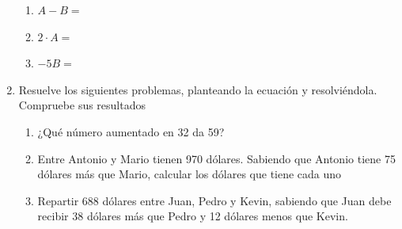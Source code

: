 \documentclass[fleqn]{article}
\begin{document}
\begin{enumerate}
\begin{enumerate}
   \item $A-B=$\noanswer[25pt]
   \item $2\cdot A=$\noanswer[25pt]
   \item $-5B=$\noanswer[25pt]
  \end{enumerate}
  \item Resuelve los siguientes problemas, planteando la ecuación y resolviéndola. Compruebe sus resultados
  \begin{enumerate}
   \item ¿Qué número aumentado en 32 da 59?\noanswer
   \item Entre Antonio y Mario tienen 970 dólares. Sabiendo que Antonio tiene 75 dólares más que Mario, calcular los dólares que tiene cada uno\noanswer
   \item Repartir 688 dólares entre Juan, Pedro y Kevin, sabiendo que Juan debe recibir 38 dólares más que Pedro y 12 dólares menos que Kevin.
  \end{enumerate}
\end{enumerate}
\end{document}
